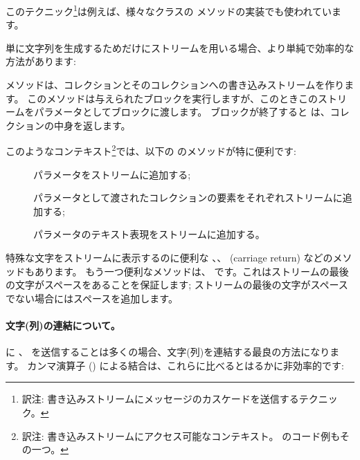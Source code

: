\documentclass[a4paper,10pt,twoside]{book}
\begin{document}
このテクニック\footnote{訳注: 書き込みストリームにメッセージのカスケードを送信するテクニック。}は例えば、様々なクラスの  メソッドの実装でも使われています。

単に文字列を生成するためだけにストリームを用いる場合、より単純で効率的な方法があります: %


 メソッドは、コレクションとそのコレクションへの書き込みストリームを作ります。
このメソッドは与えられたブロックを実行しますが、このときこのストリームをパラメータとしてブロックに渡します。
ブロックが終了すると  は、コレクションの中身を返します。

このようなコンテキスト\footnote{訳注: 書き込みストリームにアクセス可能なコンテキスト。 のコード例もその一つ。}では、以下の  のメソッドが特に便利です:

\begin{description}
\item[] パラメータをストリームに追加する;
\item[] パラメータとして渡されたコレクションの要素をそれぞれストリームに追加する;
\item[] パラメータのテキスト表現をストリームに追加する。
\end{description}

特殊な文字をストリームに表示するのに便利な 、、 (carriage return) などのメソッドもあります。%
もう一つ便利なメソッドは、 です。これはストリームの最後の文字がスペースをあることを保証します; ストリームの最後の文字がスペースでない場合にはスペースを追加します。

\paragraph{文字(列)の連結について。}
 に 、 を送信することは多くの場合、文字(列)を連結する最良の方法になります。
カンマ演算子 (\ct{,}) による結合は、これらに比べるとはるかに非効率的です:
\end{document}
